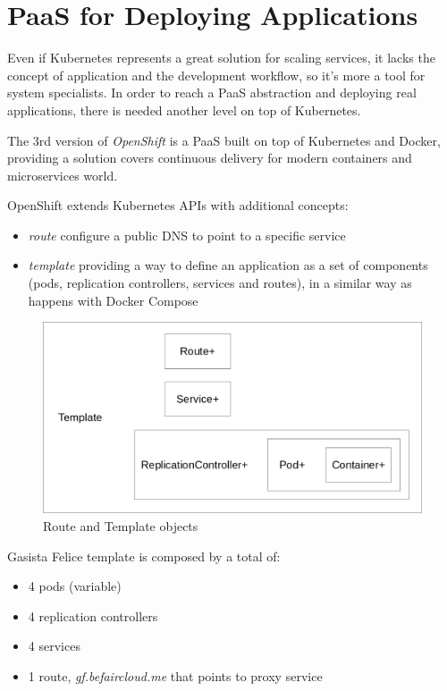 \section{PaaS for Deploying
Applications}\label{paas-for-deploying-applications}

Even if Kubernetes represents a great solution for scaling services, it lacks the concept of application and
the development workflow, so it's more a tool for system specialists. In order to reach a PaaS abstraction and deploying real applications, there is needed another level on top of Kubernetes.

The 3rd version of \textit{OpenShift} is a PaaS built on top of Kubernetes and Docker, providing a solution covers continuous delivery for modern containers and microservices world.

OpenShift extends Kubernetes APIs with additional concepts:

\begin{itemize}
\item \textit{route} configure a public DNS to point to a specific service
\item \textit{template} providing a way to define an application as a set of components (pods, replication controllers, services and routes), in a similar way as happens with Docker Compose
\end{itemize}

\begin{figure}[htbp]
\centering
\includegraphics{media/ch5-template.png}
\caption{Route and Template objects}
\end{figure}

Gasista Felice template is composed by a total of:

\begin{itemize}
\item 4 pods (variable)
\item 4 replication controllers
\item 4 services
\item 1 route, \textit{gf.befaircloud.me} that points to proxy service
\end{itemize}

